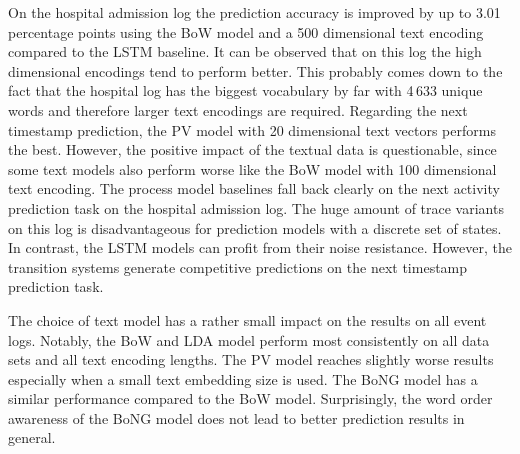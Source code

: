 On the hospital admission log the prediction accuracy is improved by up to 3.01 percentage points using the BoW model and a 500 dimensional text encoding compared to the LSTM baseline.
It can be observed that on this log the high dimensional encodings tend to perform better.
This probably comes down to the fact that the hospital log has the biggest vocabulary by far with 4\,633 unique words and therefore larger text encodings are required.
Regarding the next timestamp prediction, the PV model with 20 dimensional text vectors performs the best.
However, the positive impact of the textual data is questionable, since some text models also perform worse like the BoW model with 100 dimensional text encoding.
The process model baselines fall back clearly on the next activity prediction task on the hospital admission log.
The huge amount of trace variants on this log is disadvantageous for prediction models with a discrete set of states.
In contrast, the LSTM models can profit from their noise resistance.
However, the transition systems generate competitive predictions on the next timestamp prediction task.

The choice of text model has a rather small impact on the results on all event logs.
Notably, the BoW and LDA model perform most consistently on all data sets and all text encoding lengths.
The PV model reaches slightly worse results especially when a small text embedding size is used.
The BoNG model has a similar performance compared to the BoW model.
Surprisingly, the word order awareness of the BoNG model does not lead to better prediction results in general.








